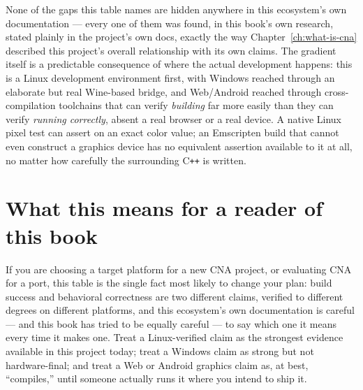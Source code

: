 None of the gaps this table names are hidden anywhere in this ecosystem's own documentation
--- every one of them was found, in this book's own research, stated plainly in the project's
own docs, exactly the way Chapter~\ref{ch:what-is-cna} described this project's
overall relationship with its own claims. The gradient itself is a predictable consequence of
where the actual development happens: this is a Linux development environment first, with
Windows reached through an elaborate but real Wine-based bridge, and Web/Android reached
through cross-compilation toolchains that can verify \emph{building} far more easily than
they can verify \emph{running correctly}, absent a real browser or a real device. A native
Linux pixel test can assert on an exact color value; an Emscripten build that cannot even
construct a graphics device has no equivalent assertion available to it at all, no matter how
carefully the surrounding C\texttt{++} is written.

\section{What this means for a reader of this book}

If you are choosing a target platform for a new CNA project, or evaluating CNA for a port,
this table is the single fact most likely to change your plan: build success and behavioral
correctness are two different claims, verified to different degrees on different platforms,
and this ecosystem's own documentation is careful --- and this book has tried to be equally
careful --- to say which one it means every time it makes one. Treat a Linux-verified claim as
the strongest evidence available in this project today; treat a Windows claim as strong but
not hardware-final; and treat a Web or Android graphics claim as, at best, ``compiles,'' until
someone actually runs it where you intend to ship it.
